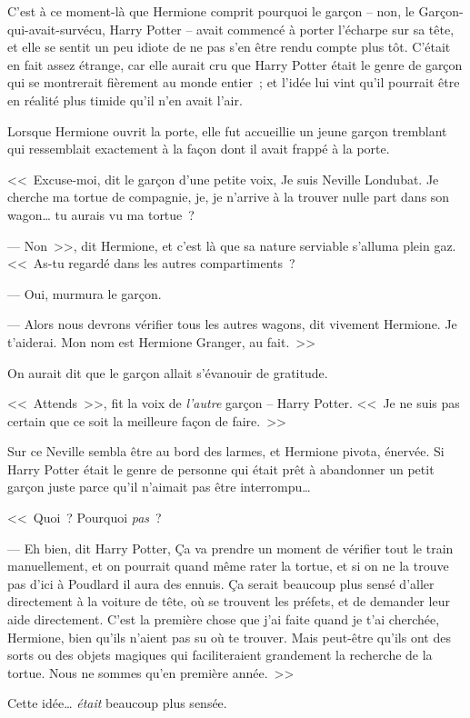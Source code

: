 C'est à ce moment-là que Hermione comprit pourquoi le garçon -- non, le Garçon-qui-avait-survécu, Harry Potter -- avait commencé à porter l'écharpe sur sa tête, et elle se sentit un peu idiote de ne pas s'en être rendu compte plus tôt. C'était en fait assez étrange, car elle aurait cru que Harry Potter était le genre de garçon qui se montrerait fièrement au monde entier~; et l'idée lui vint qu'il pourrait être en réalité plus timide qu'il n'en avait l'air.

Lorsque Hermione ouvrit la porte, elle fut accueillie un jeune garçon tremblant qui ressemblait exactement à la façon dont il avait frappé à la porte.

<<~Excuse-moi, dit le garçon d'une petite voix, Je suis Neville Londubat. Je cherche ma tortue de compagnie, je, je n'arrive à la trouver nulle part dans son wagon… tu aurais vu ma tortue~?

--- Non~>>, dit Hermione, et c'est là que sa nature serviable s'alluma plein gaz. <<~As-tu regardé dans les autres compartiments~?

--- Oui, murmura le garçon.

--- Alors nous devrons vérifier tous les autres wagons, dit vivement Hermione. Je t'aiderai. Mon nom est Hermione Granger, au fait.~>>

On aurait dit que le garçon allait s'évanouir de gratitude.

<<~Attends~>>, fit la voix de \emph{l'autre} garçon -- Harry Potter. <<~Je ne suis pas certain que ce soit la meilleure façon de faire.~>>

Sur ce Neville sembla être au bord des larmes, et Hermione pivota, énervée. Si Harry Potter était le genre de personne qui était prêt à abandonner un petit garçon juste parce qu'il n'aimait pas être interrompu…

<<~Quoi~? Pourquoi \emph{pas}~?

--- Eh bien, dit Harry Potter, Ça va prendre un moment de vérifier tout le train manuellement, et on pourrait quand même rater la tortue, et si on ne la trouve pas d'ici à Poudlard il aura des ennuis. Ça serait beaucoup plus sensé d'aller directement à la voiture de tête, où se trouvent les préfets, et de demander leur aide directement. C'est la première chose que j'ai faite quand je t'ai cherchée, Hermione, bien qu'ils n'aient pas su où te trouver. Mais peut-être qu'ils ont des sorts ou des objets magiques qui faciliteraient grandement la recherche de la tortue. Nous ne sommes qu'en première année.~>>

Cette idée… \emph{était} beaucoup plus sensée.


